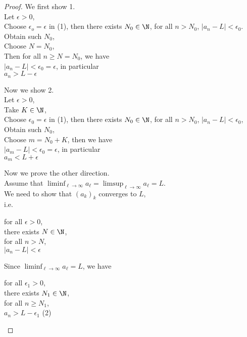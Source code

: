 \documentclass{article}
\begin{document}
\begin{proof}[Proof]
        We first show 1. \\
        Let $\epsilon > 0$, \\
        Choose $\epsilon_o = \epsilon$ in (1), then there exists $N_0 \in \N$, for all $n > N_0$, $|a_n - L| < \epsilon_0$. \\
        Obtain such $N_0$, \\
        Choose $N = N_0$, \\
        Then for all $n \ge N = N_0$, we have \\
        $|a_n - L| < \epsilon_0 = \epsilon$, in particular \\
        $a_n > L - \epsilon$

        Now we show 2. \\
        Let $\epsilon > 0$, \\
        Take $K \in \N$, \\
        Choose $\epsilon_0 = \epsilon$ in (1), then there exists $N_0 \in \N$, for all $n > N_0$, $|a_n -L| < \epsilon_0$, \\
        Obtain such $N_0$, \\
        Choose $m = N_0 + K$, then we have\\
        $|a_m - L| < \epsilon_0 = \epsilon$, in particular \\
        $a_m < L + \epsilon$

        Now we prove the other direction. \\
        Assume that $\liminf_{\ell \to \infty}a_\ell = \limsup_{\ell\to\infty}a_\ell = L$. \\
        We need to show that $(a_k)_k$ converges to $L$, \\
        i.e. 
        \begin{center}
            \parbox{\linewidth}{
                \linewidth
                for all $\epsilon > 0$, \\
                \hspace*{1em}there exists $N \in \N$, \\
                \hspace*{2em}for all $n > N$, \\
                \hspace*{3em}$|a_n - L| < \epsilon$
            }
        \end{center}

        Since $\liminf_{\ell \to \infty}a_\ell = L$, we have \\
        \begin{center}
            \parbox{\linewidth}{
                \linewidth
                for all $\epsilon_1 > 0$, \\
                \hspace*{1em}there exists $N_1 \in \N$, \\
                \hspace*{2em}for all $n \ge N_1$, \\
                \hspace*{3em}$a_n > L - \epsilon_1$
                \hfill (2)
            }
        \end{center}


\end{proof}
\end{document}
